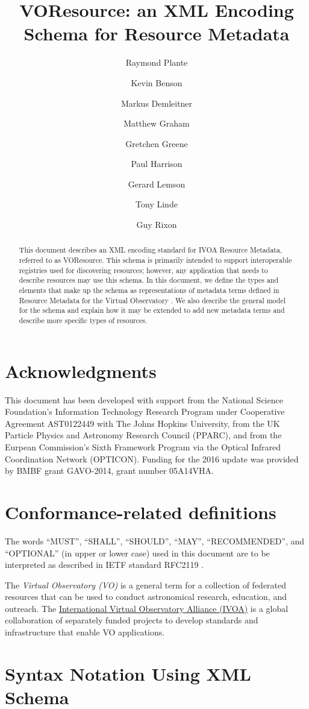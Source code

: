 \documentclass[11pt,a4paper]{ivoa}
\title{VOResource: an XML Encoding Schema for Resource Metadata}
\author[http://www.ivoa.net/twiki/bin/view/IVOA/RayPlante]{Raymond Plante}
\author[http://www.ivoa.net/twiki/bin/view/IVOA/KevinBenson]{Kevin Benson}
\author[http://www.ivoa.net/twiki/bin/view/IVOA/MarkusDemleitner]{Markus Demleitner}
\author[http://www.ivoa.net/twiki/bin/view/IVOA/MatthewGraham]{Matthew Graham}
\author[http://www.ivoa.net/twiki/bin/view/IVOA/GretchenGreene]{Gretchen Greene}
\author[http://www.ivoa.net/twiki/bin/view/IVOA/PaulHarrison]{Paul Harrison}
\author[http://www.ivoa.net/twiki/bin/view/IVOA/GerardLemson]{Gerard Lemson}
\author[http://www.ivoa.net/twiki/bin/view/IVOA/TonyLinde]{Tony Linde}
\author[http://www.ivoa.net/twiki/bin/view/IVOA/GuyRixon]{Guy Rixon}
\begin{document}
\begin{abstract}
This document describes an XML encoding standard for IVOA Resource
Metadata, referred to as VOResource.  This schema is primarily
intended to support interoperable registries used for discovering
resources; however, any application that needs to describe resources
may use this schema.  In this document, we define the types and
elements that make up the schema as representations of metadata terms
defined in Resource Metadata for the Virtual Observatory
\citep{2007ivoa.spec.0302H}.  We also describe the general model for the
schema and explain how it may be extended to add new metadata terms and
describe more specific types of resources.  
\end{abstract}


\section*{Acknowledgments}

This document has been developed with support from the
National Science Foundation's
Information Technology Research Program under Cooperative Agreement
AST0122449 with The Johns Hopkins University, from the
UK Particle Physics and Astronomy
Research Council (PPARC), and from the
Eurpean Commission's Sixth
Framework Program via the 
Optical Infrared Coordination Network (OPTICON).  Funding for the 2016
update was provided by BMBF grant GAVO-2014, grant number 05A14VHA.

\section*{Conformance-related definitions}

The words ``MUST'', ``SHALL'', ``SHOULD'', ``MAY'', ``RECOMMENDED'', and
``OPTIONAL'' (in upper or lower case) used in this document are to be
interpreted as described in IETF standard RFC2119 \citep{std:RFC2119}.

The \emph{Virtual Observatory (VO)} is a
general term for a collection of federated resources that can be used
to conduct astronomical research, education, and outreach.
The \href{http://www.ivoa.net}{International
Virtual Observatory Alliance (IVOA)} is a global
collaboration of separately funded projects to develop standards and
infrastructure that enable VO applications.

\section*{Syntax Notation Using XML Schema}
\end{document}
